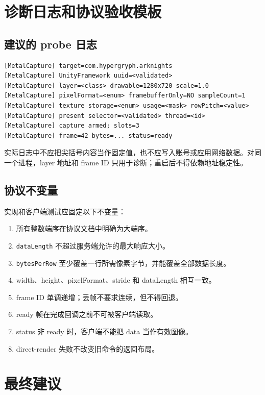 \documentclass[UTF8,a4paper,11pt]{ctexart}
\begin{document}
\section{诊断日志和协议验收模板}

\subsection{建议的 probe 日志}

\begin{lstlisting}
[MetalCapture] target=com.hypergryph.arknights
[MetalCapture] UnityFramework uuid=<validated>
[MetalCapture] layer=<class> drawable=1280x720 scale=1.0
[MetalCapture] pixelFormat=<enum> framebufferOnly=NO sampleCount=1
[MetalCapture] texture storage=<enum> usage=<mask> rowPitch=<value>
[MetalCapture] present selector=<validated> thread=<id>
[MetalCapture] capture armed; slots=3
[MetalCapture] frame=42 bytes=... status=ready
\end{lstlisting}

实际日志中不应把尖括号内容当作固定值，也不应写入账号或应用网络数据。对同一个进程，layer 地址和 frame ID 只用于诊断；重启后不得依赖地址稳定性。

\subsection{协议不变量}

实现和客户端测试应固定以下不变量：

\begin{enumerate}
  \item 所有整数端序在协议文档中明确为大端序。
  \item \texttt{dataLength} 不超过服务端允许的最大响应大小。
  \item \texttt{bytesPerRow} 至少覆盖一行所需像素字节，并能覆盖全部数据长度。
  \item width、height、pixelFormat、stride 和 dataLength 相互一致。
  \item frame ID 单调递增；丢帧不要求连续，但不得回退。
  \item ready 帧在完成回调之前不可被客户端读取。
  \item status 非 ready 时，客户端不能把 data 当作有效图像。
  \item direct-render 失败不改变旧命令的返回布局。
\end{enumerate}

\section{最终建议}
\end{document}
